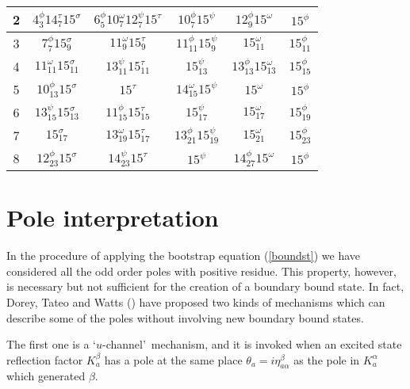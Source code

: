 \documentclass[a4paper,12pt]{report}
\begin{document}
\begin{center}
\begin{tabular}{|c|c|c|c|c|c|}
2 & $4_{3}^{\phi}14_{7}^{\tau}15^{\sigma}$ & $6_{5}^{\phi}10_{7}^{\omega}12_{7}^{\psi}15^{\tau}$ & $10_{7}^{\phi}15^{\psi}$ & $12_{9}^{\phi}15^{\omega}$ &$15^{\phi}$  \\
\hline

3  & $7_{7}^{\phi}15_{9}^{\sigma}$ & $11_{9}^{\omega}15_{9}^{\tau}$ & $11_{11}^{\phi}15_{9}^{\psi}$ & $15_{11}^{\omega}$ & $15_{11}^{\phi}$ \\
\hline

4 & $11_{11}^{\omega}15_{11}^{\sigma}$ & $13_{11}^{\psi}15_{11}^{\tau}$ & $15_{13}^{\psi}$ & $13_{13}^{\phi}15_{13}^{\omega}$ & $15_{15}^{\phi}$ \\
\hline

5  & $10_{13}^{\phi}15^{\sigma}$ & $15^{\tau}$ & $14_{15}^{\omega}15^{\psi}$ &$15^{\omega}$ & $15^{\phi}$ \\
\hline

6  & $13_{15}^{\psi}15_{13}^{\sigma}$ & $11_{15}^{\phi}15_{15}^{\tau}$ & $15_{17}^{\psi}$ & $15_{17}^{\omega}$ & $15_{19}^{\phi}$ \\
\hline

7 & $15_{17}^{\sigma}$ & $13_{19}^{\omega}15_{17}^{\tau}$ & $13_{21}^{\phi}15_{19}^{\psi}$ & $15_{21}^{\omega}$ & $15_{23}^{\phi}$  \\
\hline

8  & $12_{23}^{\phi}15^{\sigma}$ & $14_{23}^{\psi}15^{\tau}$ &$15^{\psi}$ & $14_{27}^{\phi}15^{\omega}$ & $15^{\phi}$\\
\hline

\end{tabular}
\end{center}

\vspace{1cm}


\section{Pole interpretation}

In the procedure of applying the bootstrap equation (\ref{boundst}) we have considered all the odd order poles
with positive residue. This property, however, is necessary but not sufficient for the creation of a boundary
bound state. In fact, Dorey, Tateo and Watts (\cite{tateo}) have proposed two kinds of mechanisms which can
describe some of the poles without involving new boundary bound states.

The first one is a \lq $u$-channel\rq \, mechanism, and it is invoked when an excited state reflection factor
$K_{a}^{\beta}$ has a pole at the same place $\theta_{a}=i\eta_{a\alpha}^{\beta}$ as the pole in $K_{a}^{\alpha}$
which generated $\beta$.
\end{document}
